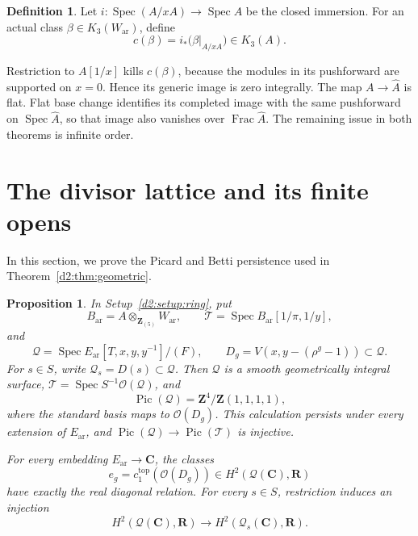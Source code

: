 \documentclass[11pt,a4paper]{amsart}
\numberwithin{equation}{section}
\newtheorem{proposition}[theorem]{Proposition}
\theoremstyle{definition}
\newtheorem{definition}[theorem]{Definition}
\theoremstyle{remark}
\newcommand{\DtwoZZ}{\mathbf{Z}}
\newcommand{\DtwoRR}{\mathbf{R}}
\newcommand{\DtwoCC}{\mathbf{C}}
\newcommand{\DtwocO}{\mathcal O}
\newcommand{\DtwocQ}{\mathcal Q}
\newcommand{\DtwocT}{\mathcal T}
\newcommand{\Dtwowh}{\widehat}
\newcommand{\Dtwotopol}{\mathrm{top}}
\newcommand{\Dtwoar}{\mathrm{ar}}
\newcommand{\DtwoSpec}{\operatorname{Spec}}
\DeclareMathOperator{\DtwoFrac}{Frac}
\DeclareMathOperator{\DtwoPic}{Pic}
\begin{document}
\begin{definition}\label{d2:defn:supported}
Let \(i\colon\DtwoSpec(A/xA)\to\DtwoSpec A\) be the closed immersion.
For an actual class \(\beta\in K_3(W_{\Dtwoar})\), define
\[
 c(\beta)=i_*\bigl(\beta|_{A/xA}\bigr)\in K_3(A).
\]
\end{definition}

Restriction to \(A[1/x]\) kills \(c(\beta)\), because the modules in its
pushforward are supported on \(x=0\). Hence its generic image is zero
integrally. The map \(A\to\Dtwowh A\) is flat.
Flat base change identifies its completed image with the same
pushforward on \(\DtwoSpec\Dtwowh A\), so that image also vanishes over
\(\DtwoFrac\Dtwowh A\). The remaining issue in both theorems is infinite order.

\section{The divisor lattice and its finite opens}\label{d2:sec:geometry}

In this section, we prove the Picard and Betti persistence used in
Theorem~\ref{d2:thm:geometric}.

\begin{proposition}\label{d2:prop:geometry}
In Setup~\ref{d2:setup:ring}, put
\[
 B_{\Dtwoar}=A\otimes_{\DtwoZZ _{(5)}}W_{\Dtwoar},
 \qquad
 \DtwocT=\DtwoSpec B_{\Dtwoar}[1/\pi,1/y],
\]
and
\[
 \DtwocQ=\DtwoSpec E_{\Dtwoar}[T,x,y,y^{-1}]/(F),
 \qquad
 D_g=V(x,y-(\rho^g-1))\subset\DtwocQ.
\]
For \(s\in S\), write \(\DtwocQ_s=D(s)\subset\DtwocQ\).
Then \(\DtwocQ\) is a smooth geometrically integral surface,
\(\DtwocT=\DtwoSpec S^{-1}\DtwocO(\DtwocQ)\), and
\[
 \DtwoPic(\DtwocQ)=\DtwoZZ ^4/\DtwoZZ(1,1,1,1),
\]
where the standard basis maps to \(\DtwocO(D_g)\).
This calculation persists under every extension of \(E_{\Dtwoar}\), and
\(\DtwoPic(\DtwocQ)\to\DtwoPic(\DtwocT)\) is injective.

For every embedding \(E_{\Dtwoar}\to\DtwoCC\), the classes
\[
 e_g=c_1^{\Dtwotopol}(\DtwocO(D_g))
       \in H^2(\DtwocQ(\DtwoCC),\DtwoRR)
\]
have exactly the real diagonal relation. For every \(s\in S\),
restriction induces an injection
\[
 H^2(\DtwocQ(\DtwoCC),\DtwoRR)\longrightarrow H^2(\DtwocQ_s(\DtwoCC),\DtwoRR).
\]
\end{proposition}
\end{document}
